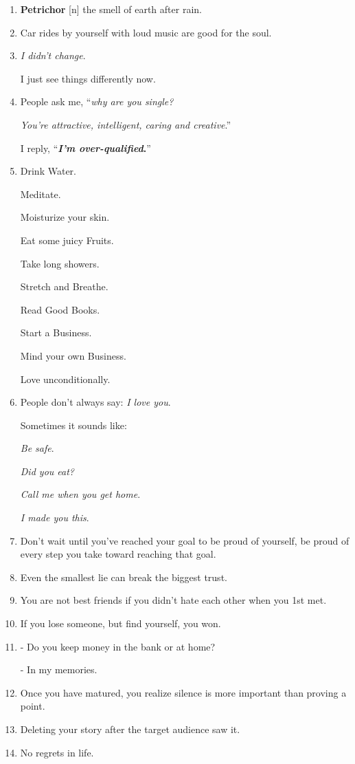 \documentclass{article}
\numberwithin{equation}{section}
\begin{document}
\begin{enumerate}
    He's very careful with his actions and decisions because he can never be the reason for her pain.
    \item \textbf{Petrichor} [n] the smell of earth after rain.
    \item Car rides by yourself with loud music are good for the soul.
    \item \textit{I didn't change}.
    
    I just see things differently now.
    \item People ask me, ``\textit{why are you single?}
    
    \textit{You're attractive, intelligent, caring and creative}.''
    
    I reply, ``\textbf{\textit{I'm over-qualified}.}''
    \item Drink Water.
    
    Meditate.
    
    Moisturize your skin.
    
    Eat some juicy Fruits.
    
    Take long showers.
    
    Stretch and Breathe.
    
    Read Good Books.
    
    Start a Business.
    
    Mind your own Business.
    
    Love unconditionally.
    \item People don't always say: \textit{I love you}.
    
    Sometimes it sounds like:
    
    \textit{Be safe}.
    
    \textit{Did you eat?}
    
    \textit{Call me when you get home}.
    
    \textit{I made you this}.
    \item Don't wait until you've reached your goal to be proud of yourself, be proud of every step you take toward reaching that goal.
    \item Even the smallest lie can break the biggest trust.
    \item You are not best friends if you didn't hate each other when you 1st met.
    \item If you lose someone, but find yourself, you won.
    \item - Do you keep money in the bank or at home?
    
    - In my memories.
    \item Once you have matured, you realize silence is more important than proving a point.
    \item Deleting your story after the target audience saw it.
    \item No regrets in life.
    

\end{enumerate}
\end{document}
